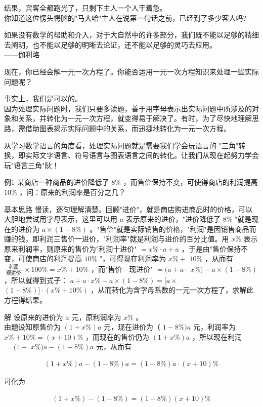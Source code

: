 \documentclass[10pt]{article}
\begin{document}
结果，宾客全都跑光了，只剩下主人一个人干着急。\\
你知道这位愣头愕脑的"马大哈"主人在说第一句话之前，已经到了多少客人吗?

如果没有数学的帮助和介入，对于大自然中的许多部分，我们既不能以足够的精细去阐明，也不能以足够的明晰去论证，还不能以足够的灵巧去应用。\\
——伽利略

现在，你已经会解一元一次方程了。你能否运用一元一次方程知识来处理一些实际问题呢？

事实上，我们是可以的。\\
因为处理实际问题时，我们只要多读题，善于用字母表示出实际问题中所涉及的对象和关系，并转化为一元一次方程，就变得易于解决了。有时，为了尽快地理解思路，需借助图表揭示实际问题中的关系，而迅捷地转化为一元一次方程。

从学习数学语言的角度看，处理实际问题就是需要我们学会玩语言的 "三角"转换，即实际文字语言、符号语言与图表语言之间的转化。让我们从现在起努力学会玩"语言三角"阦！

例1 某商店一种商品的进价降低了 $8 \%$ ，而售价保持不变，可使得商店的利润提高 $10 \%$ ，问：原来的利润率是百分之几？

基本思路 慢读，逐句理解清楚。回顾"进价"，就是商店购进商品时的价格，可以大胆地尝试用字母表示，这里可以用 $a$ 表示原来的进价，"进价降低了 $8 \%$ "就是现在的进价为 $a \times(1-8 \%)$ 。"售价"就是实际销售的价格，"利润"是因销售商品而赚的钱，即利润三售价一进价，"利润率"就是利润与进价的百分比值。用 $\dot{x} \%$ 表示原来利润率，则原来的售价为"利润十进价" $=x \% \cdot a+a$ ，于是由"售价保持不变，可使商店的利润提高 $10 \%$ "，可得现在利润率为 $x \%+$ $10 \%$ ，从而有 $\frac{\text { 利润 }}{\text { 现进价 }} \times 100 \%=x \%+10 \%$ ，而"售价 - 现进价" $=(a+a \cdot$ $x \%)-a \times(1-8 \%)$ ，所以就得到式子： $a+a \cdot x \%-a \times(1-8 \%)=[a \times$\\
$(1-8 \%)] \cdot(x \%+10 \%)$ ，从而转化为含字母系数的一元一次方程了，求解此方程得结果。

解 设原来的进价为 $a$ 元，原利润率为 $x \%$ 。\\
由题设知原售价为 $(1+x \%) a$ 元，现在进价为（ $1-8 \%) a$ 元，利润率为 $x \%+10 \%=(x+10) \%$ ，而现在的售价仍为 $(1+x \%) a$ ，所以现在利润 $=(1+$ $x \%) a-(1-8 \%) a$ 元，从而有

\begin{align*}
(1+x \%) a-(1-8 \%) a=(1-8 \%) a \cdot(x+10) \%
\end{align*}

可化为

\begin{align*}
(1+x \%)-(1-8 \%)=(1-8 \%)(x+10) \%
\end{align*}
\end{document}
